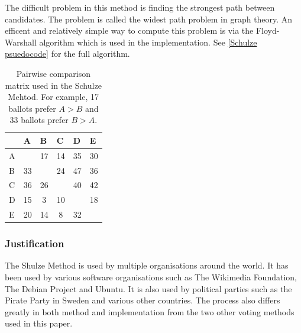 \documentclass[12pt]{article}
\begin{document}
The difficult problem in this method is finding the strongest path between candidates. The problem is called the widest path problem in graph theory. An efficent and relatively simple way to compute this problem is via the Floyd-Warshall algorithm which is used in the implementation. See \ref{Schulze psuedocode} for the full algorithm.

\begin{table}[H]
\centering
\begin{tabular}{l|c|c|c|c|c|}
\cline{2-6}
 & \multicolumn{1}{l|}{A} & \multicolumn{1}{l|}{B} & \multicolumn{1}{l|}{C} & \multicolumn{1}{l|}{D} & \multicolumn{1}{l|}{E} \\ \hline
\multicolumn{1}{|l|}{A} & \cellcolor[HTML]{9B9B9B} & \cellcolor[HTML]{FFDDDD}17 & \cellcolor[HTML]{FFDDDD}14 & \cellcolor[HTML]{DDFFDD}35 & \cellcolor[HTML]{DDFFDD}30 \\ \hline
\multicolumn{1}{|l|}{B} & \cellcolor[HTML]{DDFFDD}33 & \cellcolor[HTML]{9B9B9B} & \cellcolor[HTML]{FFDDDD}24 & \cellcolor[HTML]{DDFFDD}47 & \cellcolor[HTML]{DDFFDD}36 \\ \hline
\multicolumn{1}{|l|}{C} & \cellcolor[HTML]{DDFFDD}36 & \cellcolor[HTML]{DDFFDD}26 & \cellcolor[HTML]{9B9B9B} & \cellcolor[HTML]{DDFFDD}40 & \cellcolor[HTML]{DDFFDD}42 \\ \hline
\multicolumn{1}{|l|}{D} & \cellcolor[HTML]{FFDDDD}15 & \cellcolor[HTML]{FFDDDD}3 & \cellcolor[HTML]{FFDDDD}10 & \cellcolor[HTML]{9B9B9B} & \cellcolor[HTML]{FFDDDD}18 \\ \hline
\multicolumn{1}{|l|}{E} & \cellcolor[HTML]{FFDDDD}20 & \cellcolor[HTML]{FFDDDD}14 & \cellcolor[HTML]{FFDDDD}8 & \cellcolor[HTML]{DDFFDD}32 & \cellcolor[HTML]{9B9B9B} \\ \hline
\end{tabular}
\caption{Pairwise comparison matrix used in the Schulze Mehtod. For example, 17 ballots prefer $A>B$ and 33 ballots prefer $B>A$.}
\label{Pairwise comparison matrix}
\end{table}
\subsubsection{Justification}
The Shulze Method is used by multiple organisations around the world. It has been used by various software organisations such as The Wikimedia Foundation, The Debian Project and Ubuntu. It is also used by political parties such as the Pirate Party in Sweden and various other countries. The process also differs greatly in both method and implementation from the two other voting methods used in this paper.
\end{document}
